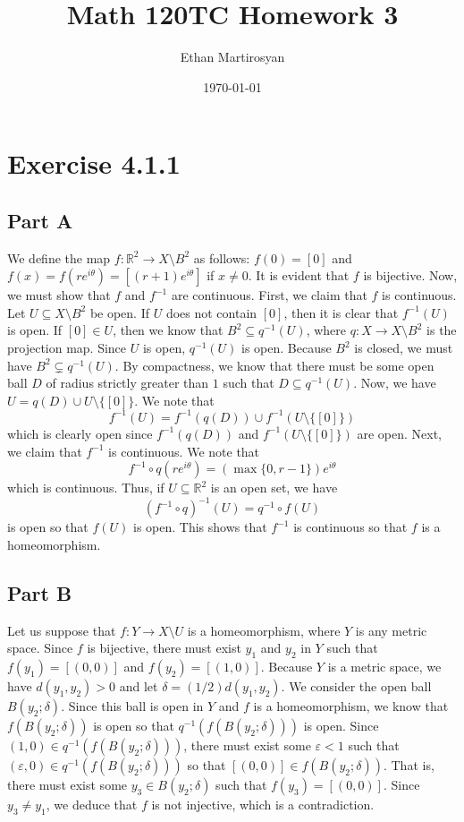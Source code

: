 \documentclass[12pt]{article}
\newcommand{\rr}{{\mathbb R}}
\begin{document}
 
\title{Math 120TC Homework 3}
\author{Ethan Martirosyan}
\date{\today}
\maketitle
{}
\hfuzz=50pt
\section*{Exercise 4.1.1}
\subsection*{Part A}
We define the map $f: \rr^2 \rightarrow X\setminus B^2$ as follows: $f(0) = [0]$ and $f(x) = f(re^{i\theta}) = [(r+1)e^{i\theta}]$ if $x \neq 0$. It is evident that $f$ is bijective. Now, we must show that $f$ and $f^{-1}$ are continuous. First, we claim that $f$ is continuous. Let $U \subseteq X \setminus B^2$ be open. If $U$ does not contain $[0]$, then it is clear that $f^{-1}(U)$ is open. If $[0] \in U$, then we know that $B^2 \subseteq q^{-1}(U)$, where $q: X \rightarrow X\setminus B^2$ is the projection map. Since $U$ is open, $q^{-1}(U)$ is open. Because $B^2$ is closed, we must have  $B^2 \subsetneq q^{-1}(U)$. By compactness, we know that there must be some open ball $D$ of radius strictly greater than $1$ such that $D \subseteq q^{-1}(U)$. Now, we have $U = q(D) \cup U \setminus \{[0]\}$. We note that 
\[
f^{-1}(U) = f^{-1}(q(D)) \cup f^{-1}(U \setminus \{[0]\})
\] which is clearly open since $f^{-1}(q(D))$ and $f^{-1}(U \setminus \{[0]\})$ are open. Next, we claim that $f^{-1}$ is continuous. We note that
\[
f^{-1} \circ q(re^{i\theta}) = (\max\{0,r-1\})e^{i\theta}
\] which is continuous. Thus, if $U \subseteq \rr^2$ is an open set, we have
\[
(f^{-1} \circ q)^{-1}(U) = q^{-1}\circ f(U)
\] is open so that $f(U)$ is open. This shows that $f^{-1}$ is continuous so that $f$ is a homeomorphism.
\newpage
\subsection*{Part B}
Let us suppose that $f: Y \rightarrow X \setminus U$ is a homeomorphism, where $Y$ is any metric space. Since $f$ is bijective, there must exist $y_1$ and $y_2$ in $Y$ such that $f(y_1) = [(0,0)]$ and $f(y_2) = [(1,0)]$. Because $Y$ is a metric space, we have $d(y_1,y_2) > 0$ and let $\delta = (1/2)d(y_1,y_2)$. We consider the open ball $B(y_2; \delta)$. Since this ball is open in $Y$ and $f$ is a homeomorphism, we know that $f(B(y_2;\delta))$ is open so that $q^{-1}(f(B(y_2;\delta)))$ is open. Since $(1,0) \in q^{-1}(f(B(y_2;\delta)))$, there must exist some $\varepsilon < 1$ such that $(\varepsilon, 0) \in q^{-1}(f(B(y_2;\delta)))$ so that $[(0,0)] \in f(B(y_2;\delta))$. That is, there must exist some $y_3 \in B(y_2;\delta)$ such that $f(y_3) = [(0,0)]$. Since $y_3 \neq y_1$, we deduce that $f$ is not injective, which is a contradiction. 
\end{document}
